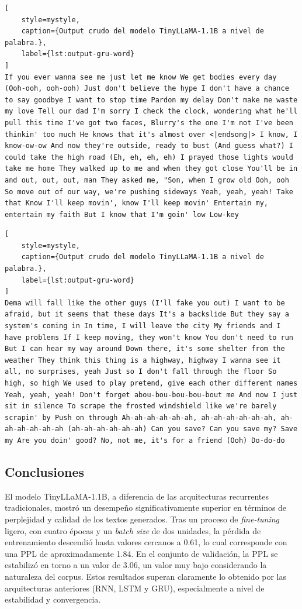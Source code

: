 \begin{lstlisting}[
    style=mystyle,
    caption={Output crudo del modelo TinyLLaMA-1.1B a nivel de palabra.},
    label={lst:output-gru-word}
]
If you ever wanna see me just let me know We get bodies every day (Ooh-ooh, ooh-ooh) Just don't believe the hype I don't have a chance to say goodbye I want to stop time Pardon my delay Don't make me waste my love Tell our dad I'm sorry I check the clock, wondering what he'll pull this time I've got two faces, Blurry's the one I'm not I've been thinkin' too much He knows that it's almost over <|endsong|> I know, I know-ow-ow And now they're outside, ready to bust (And guess what?) I could take the high road (Eh, eh, eh, eh) I prayed those lights would take me home They walked up to me and when they got close You'll be in and out, out, out, man They asked me, "Son, when I grow old Ooh, ooh So move out of our way, we're pushing sideways Yeah, yeah, yeah! Take that Know I'll keep movin', know I'll keep movin' Entertain my, entertain my faith But I know that I'm goin' low Low-key
\end{lstlisting}

\begin{lstlisting}[
    style=mystyle,
    caption={Output crudo del modelo TinyLLaMA-1.1B a nivel de palabra.},
    label={lst:output-gru-word}
]
Dema will fall like the other guys (I'll fake you out) I want to be afraid, but it seems that these days It's a backslide But they say a system's coming in In time, I will leave the city My friends and I have problems If I keep moving, they won't know You don't need to run But I can hear my way around Down there, it's some shelter from the weather They think this thing is a highway, highway I wanna see it all, no surprises, yeah Just so I don't fall through the floor So high, so high We used to play pretend, give each other different names Yeah, yeah, yeah! Don't forget abou-bou-bou-bou-bout me And now I just sit in silence To scrape the frosted windshield like we're barely scrapin' by Push on through Ah-ah-ah-ah-ah-ah, ah-ah-ah-ah-ah-ah, ah-ah-ah-ah-ah-ah (ah-ah-ah-ah-ah-ah) Can you save? Can you save my? Save my Are you doin' good? No, not me, it's for a friend (Ooh) Do-do-do
\end{lstlisting}

\subsection{Conclusiones}

El modelo TinyLLaMA-1.1B, a diferencia de las arquitecturas recurrentes tradicionales, mostró 
un desempeño significativamente superior en términos de perplejidad y calidad de los textos generados.
Tras un proceso de \textit{fine-tuning} ligero, con cuatro épocas y un \textit{batch size} de dos unidades,
la pérdida de entrenamiento descendió hasta valores cercanos a 0.61, lo cual corresponde
con una PPL de aproximadamente 1.84. En el conjunto de validación, la PPL se estabilizó 
en torno a un valor de 3.06, un valor muy bajo considerando la naturaleza del corpus. Estos resultados
superan claramente lo obtenido por las arquitecturas anteriores (RNN, LSTM y GRU), especialmente
a nivel de estabilidad y convergencia. 

